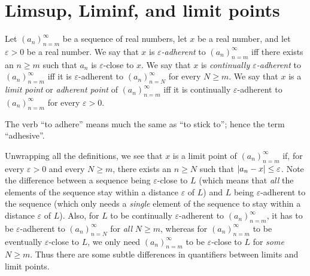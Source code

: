 \section{Limsup, Liminf, and limit points}\label{sec 6.4}

\begin{definition}\label{6.4.1}
    Let \((a_n)_{n = m}^\infty\) be a sequence of real numbers, let \(x\) be a real number, and let \(\varepsilon > 0\) be a real number.
    We say that \(x\) is \emph{\(\varepsilon\)-adherent} to \((a_n)_{n = m}^\infty\) iff there exists an \(n \geq m\) such that \(a_n\) is \(\varepsilon\)-close to \(x\).
    We say that \(x\) is \emph{continually \(\varepsilon\)-adherent} to \((a_n)_{n = m}^\infty\) iff it is \(\varepsilon\)-adherent to \((a_n)_{n = N}^\infty\) for every \(N \geq m\).
    We say that \(x\) is a \emph{limit point} or \emph{adherent point} of \((a_n)_{n = m}^\infty\) iff it is continually \(\varepsilon\)-adherent to \((a_n)_{n = m}^\infty\) for every \(\varepsilon > 0\).
\end{definition}

\begin{remark}\label{6.4.2}
    The verb ``to adhere'' means much the same as ``to stick to'';
    hence the term ``adhesive''.
\end{remark}

\begin{note}
    Unwrapping all the definitions, we see that \(x\) is a limit point of \((a_n)_{n = m}^\infty\) if, for every \(\varepsilon > 0\) and every \(N \geq m\), there exists an \(n \geq N\) such that \(\abs*{a_n - x} \leq \varepsilon\).
    Note the difference between a sequence being \(\varepsilon\)-close to \(L\)
    (which means that \emph{all} the elements of the sequence stay within a distance \(\varepsilon\) of \(L\))
    and \(L\) being \(\varepsilon\)-adherent to the sequence
    (which only needs a \emph{single} element of the sequence to stay within a distance \(\varepsilon\) of \(L\)).
    Also, for \(L\) to be continually \(\varepsilon\)-adherent to \((a_n)_{n = m}^\infty\), it has to be \(\varepsilon\)-adherent to \((a_n)_{n = N}^\infty\) for \emph{all} \(N \geq m\), whereas for \((a_n)_{n = m}^\infty\) to be eventually \(\varepsilon\)-close to \(L\), we only need \((a_n)_{n = m}^\infty\) to be \(\varepsilon\)-close to \(L\) for \emph{some} \(N \geq m\).
    Thus there are some subtle differences in quantifiers between limits and limit points.
\end{note}

